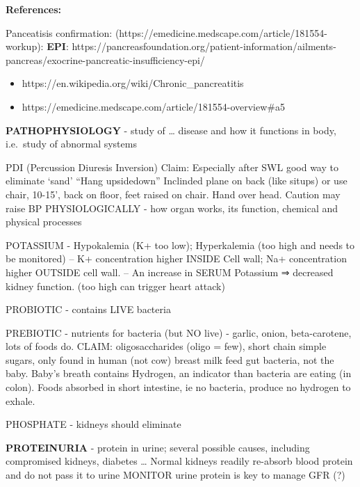 \textbf{References:}

Panceatisis confirmation:
(https://emedicine.medscape.com/article/181554-workup): \textbf{EPI}:
https://pancreasfoundation.org/patient-information/ailments-pancreas/exocrine-pancreatic-insufficiency-epi/

\begin{itemize}
\tightlist
\item
  https://en.wikipedia.org/wiki/Chronic\_pancreatitis
\item
  https://emedicine.medscape.com/article/181554-overview\#a5
\end{itemize}

\textbf{PATHOPHYSIOLOGY} - study of \ldots{} disease and how it
functions in body, i.e.~study of abnormal systems

PDI (Percussion Diuresis Inversion) Claim: Especially after SWL good way
to eliminate `sand' ``Hang upsidedown'' Inclinded plane on back (like
situps) or use chair, 10-15', back on floor, feet raised on chair. Hand
over head. Caution may raise BP PHYSIOLOGICALLY - how organ works, its
function, chemical and physical processes

POTASSIUM - Hypokalemia (K+ too low); Hyperkalemia (too high and needs
to be monitored) -- K+ concentration higher INSIDE Cell wall; Na+
concentration higher OUTSIDE cell wall. -- An increase in SERUM
Potassium ⇒ decreased kidney function. (too high can trigger heart
attack)

PROBIOTIC - contains LIVE bacteria

PREBIOTIC - nutrients for bacteria (but NO live) - garlic, onion,
beta-carotene, lots of foods do. CLAIM: oligosaccharides (oligo = few),
short chain simple sugars, only found in human (not cow) breast milk
feed gut bacteria, not the baby. Baby's breath contains Hydrogen, an
indicator than bacteria are eating (in colon). Foods absorbed in short
intestine, ie no bacteria, produce no hydrogen to exhale.

PHOSPHATE - kidneys should eliminate

\textbf{PROTEINURIA} - protein in urine; several possible causes,
including compromised kidneys, diabetes \ldots{} Normal kidneys readily
re-absorb blood protein and do not pass it to urine MONITOR urine
protein is key to manage GFR (?)

